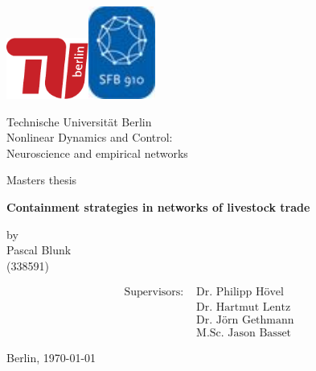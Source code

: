 \begin{titlepage}
\centerline{\includegraphics[width=2.7cm]{tu.pdf}\hfill\includegraphics[width=2.2cm]{sfb910.jpg}}
\vspace*{1cm}
\begin{center}
\large
Technische Universität Berlin\\
Nonlinear Dynamics and Control: \\ Neuroscience and empirical networks
\end{center}
\vspace*{0.8cm}
\centerline{Masters thesis}
\vspace*{0.8cm}
\begin{center}
\LARGE{\textbf{Containment strategies in networks of livestock trade}}
\end{center}
\medskip
\begin{center}
by\\
Pascal Blunk\\
(338591)
\end{center}
\vspace*{1cm}
\begin{align}
\text{Supervisors:}& \text{ Dr. Philipp H\"ovel}  \nonumber \\
 & \text{ Dr. Hartmut Lentz}   \nonumber \\
 & \text{ Dr. Jörn Gethmann}   \nonumber \\
 & \text{ M.Sc. Jason Basset} \nonumber
\end{align}

\vspace*{5cm}
\centerline{Berlin, \today}
\thispagestyle{empty}
\cleardoublepage
\end{titlepage}